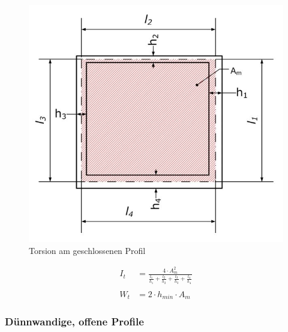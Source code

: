 \begin{figure}[h]
	\centering
	\includegraphics[scale=0.6]{Torsion_2.jpg}
	\caption{Torsion am geschlossenen Profil}
\end{figure}


\begin{align*}
I_t &= \frac{4 \cdot A_m^2}{\frac{l_1}{h_1} + \frac{l_2}{h_2} + \frac{l_3}{h_3} + \frac{l_4}{h_4}} \\
\\
W_t &= 2 \cdot h_{min} \cdot A_m
\end{align*}

\newpage

\subsubsection*{Dünnwandige, offene Profile}


